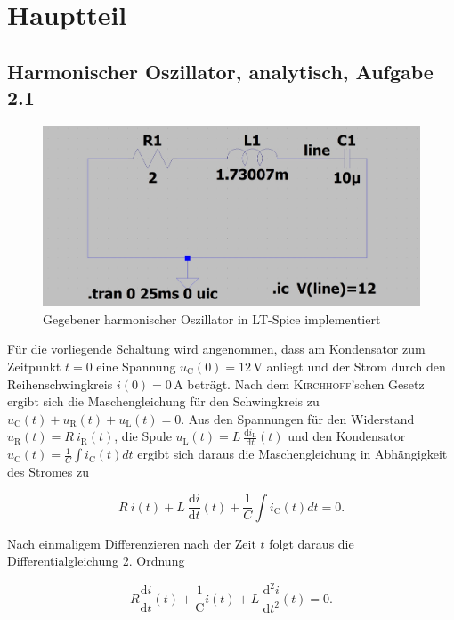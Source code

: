 
\chapter{Hauptteil}
	\section*{Harmonischer Oszillator, analytisch, Aufgabe 2.1}\label{sec:ag2.1}
	\begin{figure}[h]
		\centering
		\includegraphics[width=\textwidth]{data/harmOsz}
		\caption{Gegebener harmonischer Oszillator in LT-Spice implementiert}
		\label{oszillator}
	\end{figure}
	Für die vorliegende Schaltung wird angenommen, dass am Kondensator zum Zeitpunkt $t = 0$ eine Spannung $u_\mathrm{C}(0) = 12\,$V anliegt und der Strom durch den Reihenschwingkreis $i(0) = 0\,$A beträgt. Nach dem \textsc{Kirchhoff}'schen Gesetz ergibt sich die Maschengleichung für den Schwingkreis zu $u_\mathrm{C}(t) + u_\mathrm{R}(t) + u_\mathrm{L}(t) = 0$. Aus den Spannungen für den Widerstand $u_\mathrm{R}(t) = R \: i_\mathrm{R}(t)$, die Spule $u_\mathrm{L}(t) = L\: \frac{\mathrm{d}i_\mathrm{L}}{\mathrm{d}t}(t)$ und den Kondensator $u_\mathrm{C}(t) = \frac{1}{C} \int i_\mathrm{C}(t)dt $ ergibt sich daraus die Maschengleichung in Abhängigkeit des Stromes zu 
	
	\begin{equation*}
		R\:i(t) + L\: \frac{\mathrm{d}i}{\mathrm{d}t}(t) + \frac{1}{C} \int i_\mathrm{C}(t)dt = 0.
	\end{equation*}
	
	Nach einmaligem Differenzieren nach der Zeit $t$ folgt daraus die Differentialgleichung 2. Ordnung 
	
	\begin{equation}
		R  \frac{\mathrm{d}i}{\mathrm{d}t}(t) + \frac{1}{\mathrm{C}} i(t) +  L\: \frac{\mathrm{d^2}i}{\mathrm{d}t^2}(t) = 0.
		\label{eq:it1}
	\end{equation}
	
